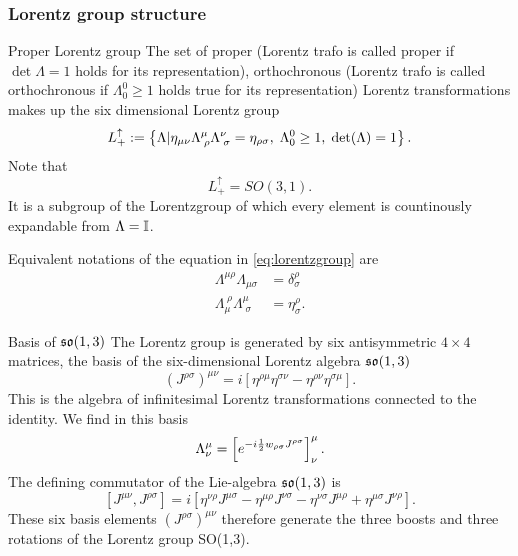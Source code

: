 \subsubsection{Lorentz group structure}
\begin{mybox}{Proper Lorentz group}
	The set of proper (Lorentz trafo is called proper if $\det\Lambda=1$ holds for its representation), orthochronous (Lorentz trafo is called orthochronous if $\Lambda^0_0 \geq 1$ holds true for its representation) Lorentz transformations makes up the six dimensional Lorentz group
	\begin{equation}
	\label{eq:lorentzgroup}
	L^\uparrow_+ :=\left\{	\Lambda| \eta_{\mu \nu}\Lambda^\mu_{\;\rho} \Lambda^\nu_{\;\sigma} = \eta_{\rho \sigma}, \; \Lambda^0_0 \geq 1,\; \det(\Lambda)=1\right\}.
	\end{equation}
	Note that 
	\begin{equation}
	L^\uparrow_+ = SO(3,1).
	\end{equation}
	It is a subgroup of the Lorentzgroup of which every element is countinously expandable from $\Lambda=\mathbb{I}$.
\end{mybox}
Equivalent notations of the equation in \ref{eq:lorentzgroup} are
\begin{align}
	\Lambda^{\mu \rho} \Lambda_{\mu \sigma} &= \delta^\rho_\sigma \\
	\Lambda^{\;\rho}_\mu \Lambda^\mu_{\;\sigma} &= \eta^\rho_\sigma.
\end{align}
\begin{mybox}{Basis of $\mathfrak{so}(1,3)$}
	The Lorentz group is generated by six antisymmetric $4\times4$ matrices, the basis of the six-dimensional Lorentz algebra $\mathfrak{so} (1,3)$
	\begin{equation}
	(J^{\rho  \sigma})^{\mu \nu} = i \left[\eta^{\rho \mu} \eta^{\sigma \nu} - \eta^{\rho \nu} \eta^{\sigma \mu} \right].
	\end{equation}
	This is the algebra of infinitesimal Lorentz transformations connected to the identity. We find in this basis
	\begin{equation}
	\Lambda^{\mu}_{\nu} = \left[e^{-i \frac{1}{2} w_{\rho \sigma }J^{\rho \sigma}  }\right]^{\mu}_{\nu}.
	\end{equation}
	The defining commutator of the Lie-algebra $\mathfrak{so}(1,3)$ is 
	\begin{equation}
	\label{eq:commutatorso3}
	[J^{\mu \nu}, J^{\rho \sigma} ] = i \left[\eta^{\nu \rho} J^{\mu \sigma} - \eta^{\mu \rho} J^{\nu \sigma} - \eta^{\nu \sigma} J^{\mu \rho} + \eta^{\mu \sigma} J^{\nu \rho}\right].
	\end{equation}
	These six basis elements $(J^{\rho \sigma})^{\mu \nu}$ therefore generate the three boosts and three rotations of the Lorentz group SO(1,3).
\end{mybox}
